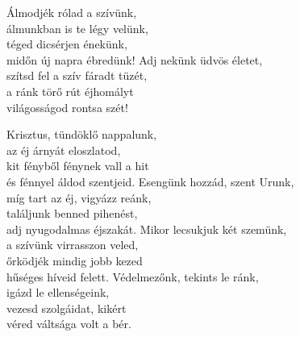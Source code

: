 \documentclass[twoside]{article}
\begin{document}


\begin{hymnstanzas}
    Álmodjék rólad a szívünk, \\
    álmunkban is te légy velünk, \\
    téged dicsérjen énekünk, \\
    midőn új napra ébredünk!
\stanzabreak
    Adj nekünk üdvös életet, \\
    szítsd fel a szív fáradt tüzét, \\
    a ránk törő rút éjhomályt \\
    világosságod rontsa szét!
\end{hymnstanzas}


\begin{hymnstanzas}
    Krisztus, tündöklő nappalunk,\\
    az éj árnyát eloszlatod,\\
    kit fényből fénynek vall a hit\\
    és fénnyel áldod szentjeid.
\stanzabreak
    Esengünk hozzád, szent Urunk, \\
    míg tart az éj, vigyázz reánk, \\
    találjunk benned pihenést, \\
    adj nyugodalmas éjszakát.
\stanzabreak
    Mikor lecsukjuk két szemünk, \\
    a szívünk virrasszon veled, \\
    őrködjék mindig jobb kezed \\
    hűséges híveid felett.
\stanzabreak
    Védelmezőnk, tekints le ránk, \\
    igázd le ellenségeink, \\
    vezesd szolgáidat, kikért \\
    véred váltsága volt a bér.
\end{hymnstanzas}
\end{document}
